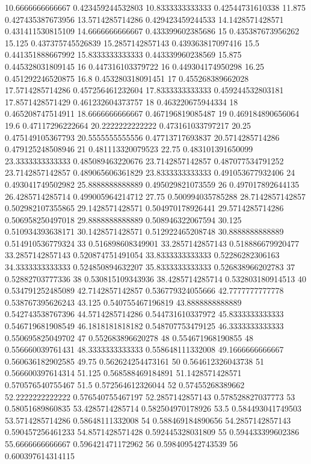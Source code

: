 {10.6666666666667 0.423459244532803
10.8333333333333 0.42544731610338
11.875 0.427435387673956
13.5714285714286 0.429423459244533
14.1428571428571 0.431411530815109
14.6666666666667 0.433399602385686
15 0.435387673956262
15.125 0.437375745526839
15.2857142857143 0.439363817097416
15.5 0.441351888667992
15.8333333333333 0.443339960238569
15.875 0.445328031809145
16 0.447316103379722
16 0.449304174950298
16.25 0.451292246520875
16.8 0.453280318091451
17 0.455268389662028
17.5714285714286 0.457256461232604
17.8333333333333 0.459244532803181
17.8571428571429 0.461232604373757
18 0.463220675944334
18 0.465208747514911
18.6666666666667 0.467196819085487
19 0.469184890656064
19.6 0.47117296222664
20.2222222222222 0.473161033797217
20.25 0.475149105367793
20.5555555555556 0.47713717693837
20.5714285714286 0.479125248508946
21 0.481113320079523
22.75 0.483101391650099
23.3333333333333 0.485089463220676
23.7142857142857 0.487077534791252
23.7142857142857 0.489065606361829
23.8333333333333 0.491053677932406
24 0.493041749502982
25.8888888888889 0.495029821073559
26 0.497017892644135
26.4285714285714 0.499005964214712
27.75 0.500994035785288
28.7142857142857 0.502982107355865
29.1428571428571 0.504970178926441
29.5714285714286 0.506958250497018
29.8888888888889 0.508946322067594
30.125 0.510934393638171
30.1428571428571 0.512922465208748
30.8888888888889 0.514910536779324
33 0.516898608349901
33.2857142857143 0.518886679920477
33.2857142857143 0.520874751491054
33.8333333333333 0.52286282306163
34.3333333333333 0.524850894632207
35.8333333333333 0.526838966202783
37 0.52882703777336
38 0.530815109343936
38.4285714285714 0.532803180914513
40 0.534791252485089
42.7142857142857 0.536779324055666
42.7777777777778 0.538767395626243
43.125 0.540755467196819
43.8888888888889 0.542743538767396
44.5714285714286 0.544731610337972
45.8333333333333 0.546719681908549
46.1818181818182 0.548707753479125
46.3333333333333 0.550695825049702
47 0.552683896620278
48 0.554671968190855
48 0.556660039761431
48.3333333333333 0.558648111332008
49.1666666666667 0.560636182902585
49.75 0.562624254473161
50 0.564612326043738
51 0.566600397614314
51.125 0.568588469184891
51.1428571428571 0.570576540755467
51.5 0.572564612326044
52 0.57455268389662
52.2222222222222 0.576540755467197
52.2857142857143 0.578528827037773
53 0.58051689860835
53.4285714285714 0.582504970178926
53.5 0.584493041749503
53.5714285714286 0.58648111332008
54 0.588469184890656
54.2857142857143 0.590457256461233
54.8571428571428 0.592445328031809
55 0.594433399602386
55.6666666666667 0.596421471172962
56 0.598409542743539
56 0.600397614314115
}
